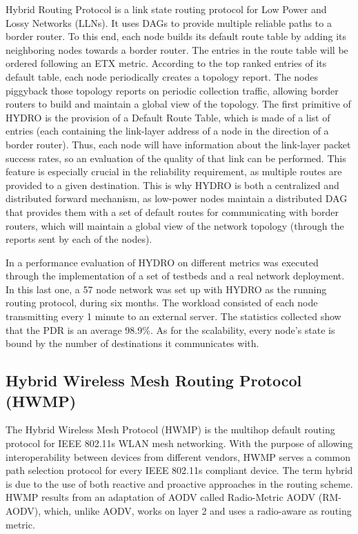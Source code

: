 \documentclass[11pt,draftclsnofoot,onecolumn]{IEEEtran}
\begin{document}
Hybrid Routing Protocol \cite{Dawson2010} is a link state routing protocol for Low Power and Lossy Networks (LLNs). It uses DAGs to provide multiple reliable paths to a border router. To this end, each node builds its default route table by adding its neighboring nodes towards a  border router. The entries in the route table will be ordered following an ETX metric. According to the top ranked entries of its default table, each node periodically creates a topology report. The nodes piggyback those topology reports on periodic collection traffic, allowing border routers to build and maintain a global view of the topology. The first primitive of HYDRO is the provision of a Default Route Table, which is made of a list of entries (each containing the link-layer address of a node in the direction of a border router). Thus, each node will have information about the link-layer packet success rates, so an evaluation of the quality of that link can be performed. This feature is especially crucial in the reliability requirement, as multiple routes are provided to a given destination. This is why HYDRO is both a centralized and distributed forward mechanism, as low-power nodes maintain a distributed DAG that provides them with a set of default routes for communicating with border routers, which will maintain a global view of the network topology (through the reports sent by each of the nodes). 

In \cite{Dawson2010} a performance evaluation of HYDRO on different metrics was executed through the implementation of a set of testbeds and a real network deployment. In this last one, a 57 node network was set up with HYDRO as the running routing protocol, during six months. The workload consisted of each node transmitting every 1 minute to an external server. The statistics collected show that the PDR is an average 98.9\%. As for the scalability, every node’s state is bound by the number of destinations it communicates with. 

\subsection{Hybrid Wireless Mesh Routing Protocol (HWMP)}\label{hwmp}

The Hybrid Wireless Mesh Protocol (HWMP) is the multihop default routing protocol for IEEE 802.11s WLAN mesh networking. With the purpose of allowing interoperability between devices from different vendors, HWMP serves a common path selection protocol for every IEEE 802.11s compliant device. The term hybrid is due to the use of both reactive and proactive approaches in the routing scheme. HWMP results from an adaptation of AODV called Radio-Metric AODV (RM-AODV), which, unlike AODV, works on layer 2 and uses a radio-aware as routing metric. 
\end{document}
